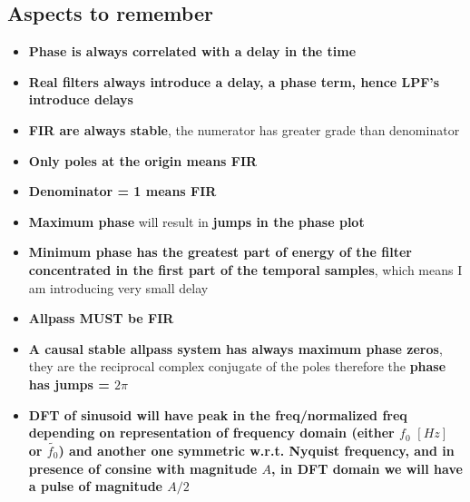 \subsection{Aspects to remember}
\begin{itemize}
    \item \textbf{Phase is always correlated with a delay in the time}
    \item \textbf{Real filters always introduce a delay, a phase term, hence LPF's introduce delays}
    \item \textbf{FIR are always stable}, the numerator has greater grade than denominator
    \item \textbf{Only poles at the origin means FIR}
    \item \textbf{Denominator = 1 means FIR}
    \item \textbf{Maximum phase} will result in \textbf{jumps in the phase plot}
    \item \textbf{Minimum phase has the greatest part of energy of the filter concentrated in the first part of the temporal samples}, which means I am introducing very small delay
    \item \textbf{Allpass MUST be FIR}
    \item \textbf{A causal stable allpass system has always maximum phase
    zeros}, they are the reciprocal complex conjugate of the poles therefore the \textbf{phase has jumps = $2\pi$}
    \item \textbf{DFT of sinusoid will have peak in the freq/normalized freq depending on representation of frequency domain (either $f_0\,\,[Hz]$ or $\tilde{f_0}$) and another one symmetric w.r.t. Nyquist frequency, and in presence of consine with magnitude $A$, in DFT domain we will have a pulse of magnitude $A/2$}
\end{itemize}